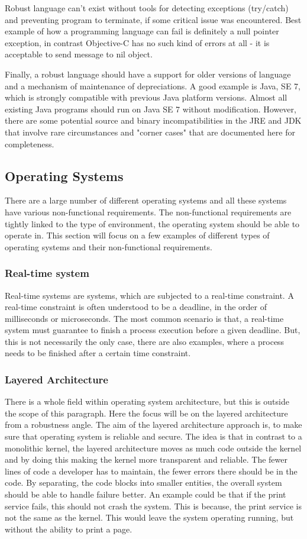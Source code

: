   Robust language can't exist without tools for detecting exceptions (try/catch) and preventing program to terminate, if some critical issue was encountered. Best example of how a programming language can fail is definitely a null pointer exception, in contrast Objective-C has no such kind of errors at all - it is acceptable to send message to nil object.

  Finally, a robust language should have a support for older versions of language and a mechanism of maintenance of depreciations. A good example is Java, SE 7, which is strongly compatible with previous Java platform versions. Almost all existing Java programs should run on Java SE 7 without modification. However, there are some  potential source and binary incompatibilities in the JRE and JDK that involve rare circumstances and "corner cases" that are documented here for completeness.\cite{huhns2002robust}

\subsection{Operating Systems}
  There are a large number of different operating systems and all these systems have various non-functional requirements. The non-functional requirements are tightly linked to the type of environment, the operating system should be able to operate in. This section will focus on a few examples of different types of operating systems and their non-functional requirements.

  \subsubsection{Real-time system}
    Real-time systems are systems, which are subjected to a real-time constraint. A real-time constraint is often understood to be a deadline, in the order of milliseconds or microseconds. The most common scenario is that, a real-time system must guarantee to finish a process execution before a given deadline. But, this is not necessarily the only case, there are also examples, where a process needs to be finished after a certain time constraint.
  
  \subsubsection{Layered Architecture}
    There is a whole field within operating system architecture, but this is outside the scope of this paragraph. Here the focus will be on the layered architecture from a robustness angle. The aim of the layered architecture approach is, to make sure that operating system is reliable and secure. The idea is that in contrast to a monolithic kernel, the layered architecture moves as much code outside the kernel and by doing this making the kernel more transparent and reliable. The fewer lines of code a developer has to maintain, the fewer errors there should be in the code. By separating, the code blocks into smaller entities, the overall system should be able to handle failure better. An example could be that if the print service fails, this should not crash the system. This is because, the print service is not the same as the kernel. This would leave the system operating running, but without the ability to print a page.
